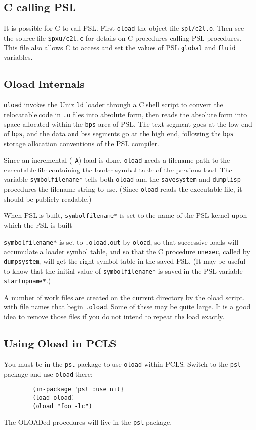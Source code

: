 \subsection{C calling PSL}

It is possible for C to call PSL.  First {\tt oload} the object file
{\tt \$pl/c2l.o}.  Then see the source file {\tt \$pxu/c2l.c} for
details on C procedures calling PSL procedures.  This file also allows
C to access and set the values of PSL {\tt global} and {\tt fluid} variables.

\subsection{Oload Internals}

{\tt oload} invokes the Unix {\tt ld} loader through a C shell script to
convert the relocatable code in {\tt .o} files into absolute form, then
reads the absolute form into space allocated within the {\tt bps} area of
PSL.  The text segment goes at the low end of {\tt bps}, and the data and
bss segments go at the high end, following the {\tt bps} storage allocation
conventions of the PSL compiler.

Since an incremental ({\tt -A}) load is done, {\tt oload} needs a
filename path to the executable file containing the loader symbol
table of the previous load.  The variable {\tt symbolfilename*} tells
both {\tt oload} and the {\tt savesystem} and {\tt dumplisp}
procedures the filename string to use.  (Since {\tt oload} reads the
executable file, it should be publicly readable.)

When PSL is built, {\tt symbolfilename*} is set to the
name of the PSL kernel upon which the PSL is built.

{\tt symbolfilename*} is set to {\tt .oload.out} by {\tt oload}, so
that successive loads will accumulate a loader symbol table, and so
that the C procedure {\tt unexec}, called by {\tt dumpsystem}, will
get the right symbol table in the saved PSL.  (It may be useful to
know that the initial value of {\tt symbolfilename*} is saved in
the PSL variable {\tt startupname*}.)

A number of work files are created on the current directory by the
oload script, with file names that begin {\tt .oload}.  Some of these may
be quite large.  It is a good idea to remove those files if you do not
intend to repeat the load exactly.

\subsection{Using Oload in PCLS}

You must be in the {\tt psl} package to use {\tt oload} within PCLS.
Switch to the {\tt psl} package and use {\tt oload} there:
\begin{verbatim}
        (in-package 'psl :use nil}
        (load oload)
        (oload "foo -lc")
\end{verbatim}
The OLOADed procedures will live in the {\tt psl} package.



